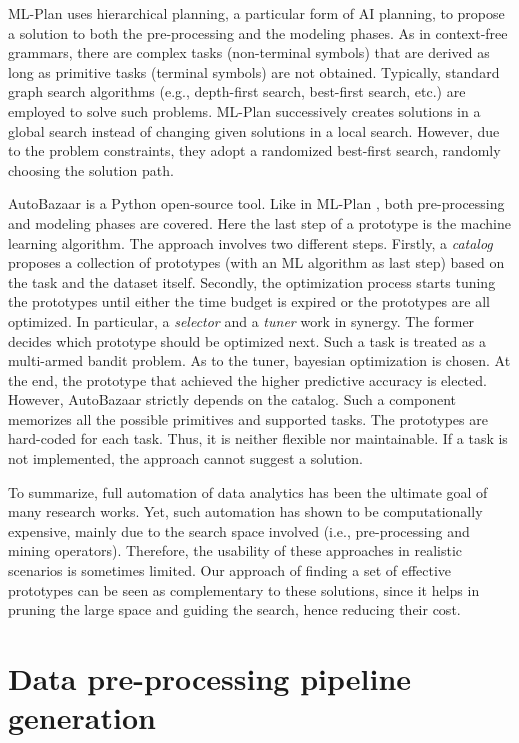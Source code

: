 ML-Plan \cite{mohr2018ml} uses hierarchical planning, a particular form of AI planning, to propose a solution to both the pre-processing and the modeling phases.
As in context-free grammars, there are complex tasks (non-terminal symbols) that are derived as long as primitive tasks (terminal symbols) are not obtained.
Typically, standard graph search algorithms (e.g., depth-first search, best-first search, etc.) are employed to solve such problems.
ML-Plan successively creates solutions in a global search instead of changing given solutions in a local search. However, due to the problem constraints, they adopt a randomized best-first search, randomly choosing the solution path.

AutoBazaar \cite{AutoBazaar} is a Python open-source tool.
Like in ML-Plan \cite{mohr2018ml}, both pre-processing and modeling phases are covered.
Here the last step of a prototype is the machine learning algorithm.
The approach involves two different steps.
Firstly, a \textit{catalog} proposes a collection of prototypes (with an ML algorithm as last step) based on the task and the dataset itself.
Secondly, the optimization process starts tuning the prototypes until either the time budget is expired or the prototypes are all optimized.
In particular, a \textit{selector} and a \textit{tuner} work in synergy.
The former decides which prototype should be optimized next.
Such a task is treated as a multi-armed bandit problem.
As to the tuner, bayesian optimization is chosen.
At the end, the prototype that achieved the higher predictive accuracy is elected.
However, AutoBazaar strictly depends on the catalog.
Such a component memorizes all the possible primitives and supported tasks.
The prototypes are hard-coded for each task.
Thus, it is neither flexible nor maintainable.
If a task is not implemented, the approach cannot suggest a solution.

To summarize, full automation of data analytics has been the ultimate goal of many research works.
Yet, such automation has shown to be computationally expensive, mainly due to the search space involved (i.e., pre-processing and mining operators).
Therefore, the usability of these approaches in realistic scenarios is sometimes limited.
Our approach of finding a set of effective prototypes can be seen as complementary to these solutions, since it helps in pruning the large space and guiding the search, hence reducing their cost.

\section{Data pre-processing pipeline generation}
\label{sec:methodology}

